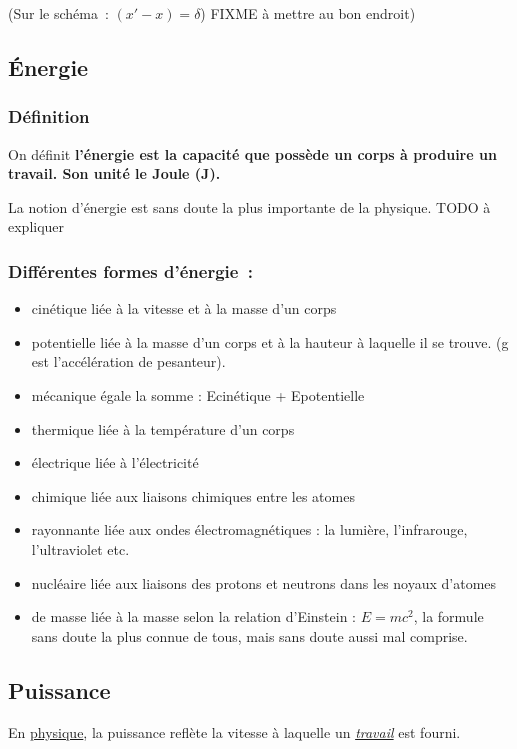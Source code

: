 (Sur le schéma~: $(x'-x) = \delta$) FIXME à mettre au bon endroit)

\subsection{Énergie}

\subsubsection{Définition}
On définit \textbf{ l'énergie est la capacité que
possède un corps à produire un travail. Son unité le Joule (J).}

La notion d'énergie est sans doute la plus importante de la physique. 
TODO à expliquer

\subsubsection{Différentes formes d'énergie~: }
\begin{itemize}
\item cinétique liée à la vitesse et à la masse d'un corps
\item potentielle liée à la masse d'un corps et à la hauteur à laquelle il
se trouve. (g est l'accélération de pesanteur).
\item mécanique égale la somme : Ecinétique + Epotentielle
\item thermique liée à la température d'un corps
\item électrique liée à l'électricité
\item chimique liée aux liaisons chimiques entre les atomes
\item rayonnante liée aux ondes électromagnétiques : la lumière,
l'infrarouge, l'ultraviolet etc.
\item nucléaire liée aux liaisons des protons et neutrons dans les noyaux
d'atomes
\item de masse liée à la masse selon la relation d'Einstein : $E = m c^2$, 
la formule sans doute la plus connue de tous, mais sans doute aussi mal 
comprise.
\end{itemize}



\subsection{Puissance }

En \href{https://fr.wikipedia.org/wiki/Physique}{physique},
la puissance reflète la vitesse à laquelle un
\href{https://fr.wikipedia.org/wiki/Travail_d\%27une_force}{\emph{\emph{travail}}}
est fourni.

